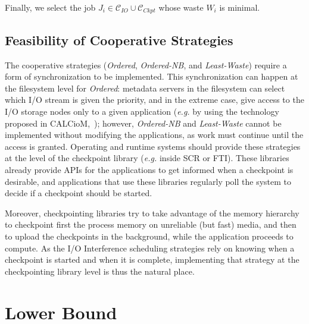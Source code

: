 \documentclass[conference,nofonttune]{IEEEtran}
\newcommand{\eg}[0]{\emph{e.g.}\xspace}
\newcommand{\wap}[1]{W_{#1}}
\newcommand{\Catiocat}{\mathcal{C}_{IO}\xspace}
\newcommand{\Catckptcat}{\mathcal{C}_{Ckpt}\xspace}
\newcommand{\fifoblock}{\emph{Ordered}\xspace}
\newcommand{\fifononblock}{\emph{Ordered-NB}\xspace}
\newcommand{\leastwaste}{\emph{Least-Waste}\xspace}
\begin{document}
Finally, we select the job $J_{i} \in \Catiocat \cup \Catckptcat$
whose waste $\wap{i}$ is minimal.

\subsection{Feasibility of Cooperative Strategies}
\label{sec:feasibility}

The cooperative strategies (\fifoblock, \fifononblock, and
\leastwaste) require a form of synchronization to be implemented. This
synchronization can happen at the filesystem level for \fifoblock:
metadata servers in the filesystem can select which I/O stream is
given the priority, and in the extreme case, give access to the I/O
storage nodes only to a given application (\eg by using the technology
proposed in CALCioM,~\cite{Dorier2015}); however, \fifononblock and
\leastwaste cannot be implemented without modifying the applications,
as work must continue until the access is granted.
Operating and runtime systems should provide these strategies at the level 
of the checkpoint library (\eg inside SCR or FTI). These libraries already provide APIs for the
applications to get informed when a checkpoint is desirable, and
applications that use these libraries regularly poll the system to
decide if a checkpoint should be started.

Moreover, checkpointing libraries try to take advantage of the memory
hierarchy to checkpoint first the process memory on unreliable (but
fast) media, and then to upload the checkpoints in the background,
while the application proceeds to compute. As the I/O Interference
scheduling strategies rely on knowing when a checkpoint is started and
when it is complete, implementing that strategy at the checkpointing
library level is thus the natural place.

%

\section{Lower Bound}
\label{sec:lowerbound}
\end{document}
